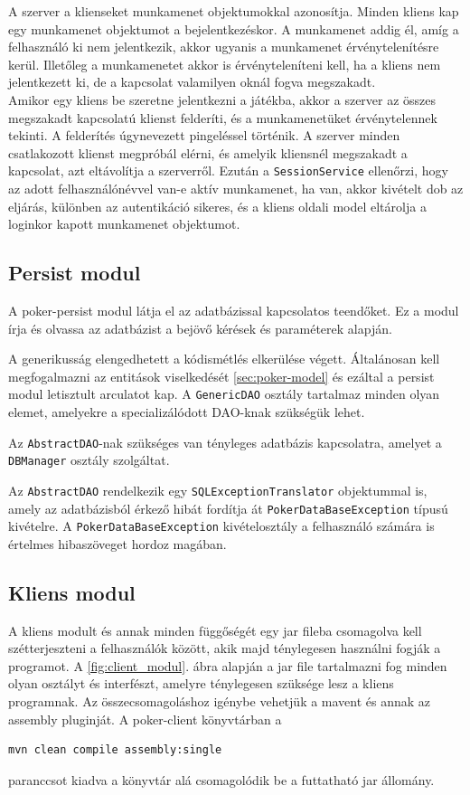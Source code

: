 A szerver a klienseket munkamenet objektumokkal azonosítja. Minden kliens kap egy munkamenet objektumot a bejelentkezéskor. A munkamenet addig él, amíg a felhasználó ki nem jelentkezik, akkor ugyanis a munkamenet érvénytelenítésre kerül. Illetőleg a munkamenetet akkor is érvényteleníteni kell, ha a kliens nem jelentkezett ki, de a kapcsolat valamilyen oknál fogva megszakadt. \\
Amikor egy kliens be szeretne jelentkezni a játékba, akkor a szerver az összes megszakadt kapcsolatú klienst felderíti, és a munkamenetüket érvénytelennek tekinti. A felderítés úgynevezett pingeléssel történik. A szerver minden csatlakozott klienst megpróbál elérni, és amelyik kliensnél megszakadt a kapcsolat, azt eltávolítja a szerverről. Ezután a \texttt{SessionService} ellenőrzi, hogy az adott felhasználónévvel van-e aktív munkamenet, ha van, akkor kivételt dob az eljárás, különben az autentikáció sikeres, és a kliens oldali model eltárolja a loginkor kapott munkamenet objektumot.

\subsection{Persist modul}
A poker-persist modul látja el az adatbázissal kapcsolatos teendőket. Ez a modul írja és olvassa az adatbázist a bejövő kérések és paraméterek alapján.

A generikusság elengedhetett a kódismétlés elkerülése végett. Általánosan kell megfogalmazni az entitások viselkedését \ref{sec:poker-model} és ezáltal a persist modul letisztult arculatot kap. A \texttt{GenericDAO} osztály tartalmaz minden olyan elemet, amelyekre a specializálódott DAO-knak szükségük lehet.

Az \texttt{AbstractDAO}-nak szükséges van tényleges adatbázis kapcsolatra, amelyet a \texttt{DBManager} osztály szolgáltat.

Az \texttt{AbstractDAO} rendelkezik egy \texttt{SQLExceptionTranslator} objektummal is, amely az adatbázisból érkező hibát fordítja át \texttt{PokerDataBaseException} típusú kivételre. A \texttt{PokerDataBaseException} kivételosztály a felhasználó számára is értelmes hibaszöveget hordoz magában.

\subsection{Kliens modul}
A kliens modult és annak minden függőségét egy jar fileba csomagolva kell szétterjeszteni a felhasználók között, akik majd ténylegesen használni fogják a programot. A \ref{fig:client_modul}. ábra alapján a jar file tartalmazni fog minden olyan osztályt és interfészt, amelyre ténylegesen szüksége lesz a kliens programnak. Az összecsomagoláshoz igénybe vehetjük a mavent és annak az assembly pluginját. A poker-client könyvtárban a
 \begin{Verbatim}[xleftmargin=.5in]
mvn clean compile assembly:single
\end{Verbatim}
paranccsot kiadva a  könyvtár alá csomagolódik be a futtatható jar állomány.

